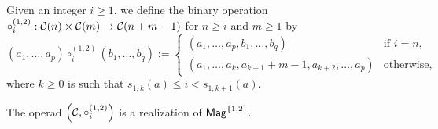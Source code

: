 Given an integer $i \geq 1$, we define the binary operation
\begin{math}
    \circ_i^{(1,2)} : \mathcal{C}(n) \times \mathcal{C}(m)
    \to\mathcal{C}(n + m - 1)
\end{math}
for $n \geq i$ and $m \geq 1$ by
\begin{equation}
    \left(a_1, \dots, a_p\right) \circ_i^{(1,2)}
    \left(b_1, \dots, b_{q}\right)
    :=
    \begin{cases}
        \left(a_1, \dots ,a_{p}, b_1, \dots ,b_{q}\right) &
        \mbox{if } i = n, \\
        \left(a_1, \dots, a_{k}, a_{k+1} + m - 1, a_{k + 2}, \dots,
            a_p\right)
            & \mbox{otherwise},
    \end{cases}
\end{equation}
where $k \geq 0$ is such that $s_{1, k}(a) \leq i < s_{1, k + 1}(a)$.
\medbreak

\begin{Proposition} \label{prop:Realisation_Mag_1_2}
The operad
$\left(\mathcal{C}, \circ_i^{(1,2)}\right)$
is a realization of $\mathsf{Mag}^{\{1, 2\}}$.
\end{Proposition}

